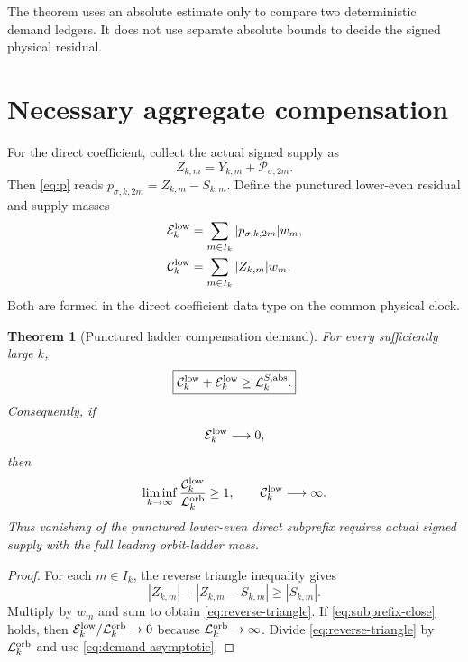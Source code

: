 \documentclass[11pt]{article}
\newtheorem{theorem}{Theorem}[section]
\theoremstyle{remark}
\newcommand{\cP}{\mathcal P}
\newcommand{\cE}{\mathcal E}
\newcommand{\cL}{\mathcal L}
\newcommand{\cC}{\mathcal C}
\begin{document}
The theorem uses an absolute estimate only to compare two deterministic
demand ledgers.  It does not use separate absolute bounds to decide the
signed physical residual.

\section{Necessary aggregate compensation}

For the direct coefficient, collect the actual signed supply as
\begin{equation}\label{eq:Z}
 Z_{k,m}=Y_{k,m}+\cP_{\sigma,2m}.
\end{equation}
Then \eqref{eq:p} reads $p_{\sigma,k,2m}=Z_{k,m}-S_{k,m}$.  Define the
punctured lower-even residual and supply masses
\begin{align}
 \cE_k^{\rm low}
 &=\sum_{m\in I_k}|p_{\sigma,k,2m}|w_m,
 \label{eq:E-low}\\
 \cC_k^{\rm low}
 &=\sum_{m\in I_k}|Z_{k,m}|w_m.
 \label{eq:C-low}
\end{align}
Both are formed in the direct coefficient data type on the common physical
clock.

\begin{theorem}[Punctured ladder compensation demand]\label{thm:compensation}
For every sufficiently large $k$,
\begin{equation}\label{eq:reverse-triangle}
 \boxed{
 \cC_k^{\rm low}+\cE_k^{\rm low}
 \ge \cL_k^{S,\rm abs}.}
\end{equation}
Consequently, if
\begin{equation}\label{eq:subprefix-close}
 \cE_k^{\rm low}\longrightarrow0,
\end{equation}
then
\begin{equation}\label{eq:supply-liminf}
 \liminf_{k\to\infty}
 \frac{\cC_k^{\rm low}}{\cL_k^{\rm orb}}\ge1,
 \qquad
 \cC_k^{\rm low}\longrightarrow\infty.
\end{equation}
Thus vanishing of the punctured lower-even direct subprefix requires actual
signed supply with the full leading orbit-ladder mass.
\end{theorem}

\begin{proof}
For each $m\in I_k$, the reverse triangle inequality gives
\[
 |Z_{k,m}|+|Z_{k,m}-S_{k,m}|\ge|S_{k,m}|.
\]
Multiply by $w_m$ and sum to obtain \eqref{eq:reverse-triangle}.  If
\eqref{eq:subprefix-close} holds, then
$\cE_k^{\rm low}/\cL_k^{\rm orb}\to0$ because
$\cL_k^{\rm orb}\to\infty$.  Divide \eqref{eq:reverse-triangle} by
$\cL_k^{\rm orb}$ and use \eqref{eq:demand-asymptotic}.
\end{proof}
\end{document}
